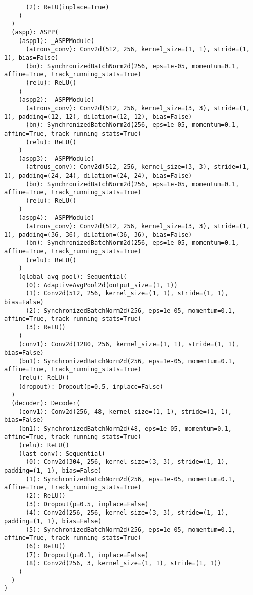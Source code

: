 \begin{verbatim}
      (2): ReLU(inplace=True)
    )
  )
  (aspp): ASPP(
    (aspp1): _ASPPModule(
      (atrous_conv): Conv2d(512, 256, kernel_size=(1, 1), stride=(1, 1), bias=False)
      (bn): SynchronizedBatchNorm2d(256, eps=1e-05, momentum=0.1, affine=True, track_running_stats=True)
      (relu): ReLU()
    )
    (aspp2): _ASPPModule(
      (atrous_conv): Conv2d(512, 256, kernel_size=(3, 3), stride=(1, 1), padding=(12, 12), dilation=(12, 12), bias=False)
      (bn): SynchronizedBatchNorm2d(256, eps=1e-05, momentum=0.1, affine=True, track_running_stats=True)
      (relu): ReLU()
    )
    (aspp3): _ASPPModule(
      (atrous_conv): Conv2d(512, 256, kernel_size=(3, 3), stride=(1, 1), padding=(24, 24), dilation=(24, 24), bias=False)
      (bn): SynchronizedBatchNorm2d(256, eps=1e-05, momentum=0.1, affine=True, track_running_stats=True)
      (relu): ReLU()
    )
    (aspp4): _ASPPModule(
      (atrous_conv): Conv2d(512, 256, kernel_size=(3, 3), stride=(1, 1), padding=(36, 36), dilation=(36, 36), bias=False)
      (bn): SynchronizedBatchNorm2d(256, eps=1e-05, momentum=0.1, affine=True, track_running_stats=True)
      (relu): ReLU()
    )
    (global_avg_pool): Sequential(
      (0): AdaptiveAvgPool2d(output_size=(1, 1))
      (1): Conv2d(512, 256, kernel_size=(1, 1), stride=(1, 1), bias=False)
      (2): SynchronizedBatchNorm2d(256, eps=1e-05, momentum=0.1, affine=True, track_running_stats=True)
      (3): ReLU()
    )
    (conv1): Conv2d(1280, 256, kernel_size=(1, 1), stride=(1, 1), bias=False)
    (bn1): SynchronizedBatchNorm2d(256, eps=1e-05, momentum=0.1, affine=True, track_running_stats=True)
    (relu): ReLU()
    (dropout): Dropout(p=0.5, inplace=False)
  )
  (decoder): Decoder(
    (conv1): Conv2d(256, 48, kernel_size=(1, 1), stride=(1, 1), bias=False)
    (bn1): SynchronizedBatchNorm2d(48, eps=1e-05, momentum=0.1, affine=True, track_running_stats=True)
    (relu): ReLU()
    (last_conv): Sequential(
      (0): Conv2d(304, 256, kernel_size=(3, 3), stride=(1, 1), padding=(1, 1), bias=False)
      (1): SynchronizedBatchNorm2d(256, eps=1e-05, momentum=0.1, affine=True, track_running_stats=True)
      (2): ReLU()
      (3): Dropout(p=0.5, inplace=False)
      (4): Conv2d(256, 256, kernel_size=(3, 3), stride=(1, 1), padding=(1, 1), bias=False)
      (5): SynchronizedBatchNorm2d(256, eps=1e-05, momentum=0.1, affine=True, track_running_stats=True)
      (6): ReLU()
      (7): Dropout(p=0.1, inplace=False)
      (8): Conv2d(256, 3, kernel_size=(1, 1), stride=(1, 1))
    )
  )
)


\end{verbatim}
